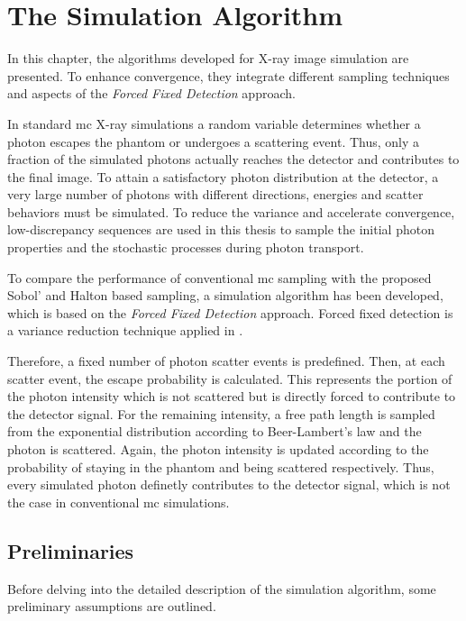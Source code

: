 \chapter{The Simulation Algorithm}
\label{chapter10}

In this chapter, the algorithms developed for X-ray image simulation are
presented. To enhance convergence, they integrate different sampling techniques
and aspects of the \emph{Forced Fixed Detection} approach.

In standard \ac{mc} X-ray simulations a random variable determines whether a
photon escapes the phantom or undergoes a scattering event. Thus, only a
fraction of the simulated photons actually reaches the detector and contributes
to the final image. To attain a satisfactory photon distribution at the
detector, a very large number of photons with different directions, energies and
scatter behaviors must be simulated. To reduce the variance and accelerate
convergence, low-discrepancy sequences are used in this thesis to sample the
initial photon properties and the stochastic processes during photon transport.

To compare the performance of conventional \ac{mc} sampling with the proposed
Sobol' and Halton based sampling, a simulation algorithm has been developed,
which is based on the \emph{Forced Fixed Detection} approach. Forced fixed
detection is a variance reduction technique applied in
\cite{fd2001,qmcXray2023}. 

Therefore, a fixed number of photon scatter events is predefined. Then, at each
scatter event, the escape probability is calculated. This represents the portion
of the photon intensity which is not scattered but is directly forced to
contribute to the detector signal. For the remaining intensity, a free path
length is sampled from the exponential distribution according to Beer-Lambert's
law and the photon is scattered. Again, the photon intensity is updated
according to the probability of staying in the phantom and being scattered
respectively. Thus, every simulated photon definetly contributes to the detector
signal, which is not the case in conventional \ac{mc} simulations.

\section{Preliminaries}

Before delving into the detailed description of the simulation algorithm, some
preliminary assumptions are outlined. 

